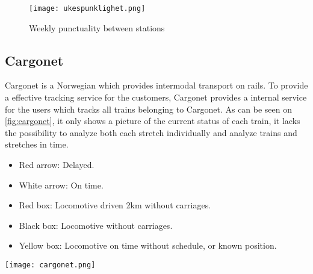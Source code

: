 \begin{figure}[!htbp]
	\texttt{[image: ukespunklighet.png]}
	\caption[Weekly punctuality between stations]{Weekly punctuality between stations \cite{sintefPresis}}
	\label{fig:ukespunklighet}
\end{figure}
\pagebreak

\subsection{Cargonet} %
\label{sub:subsection_cargonet}

Cargonet is a Norwegian which provides intermodal transport on rails. To 
provide a effective tracking service for the customers, Cargonet provides a 
internal service for the users which tracks all trains belonging to Cargonet.
As can be seen on \vref{fig:cargonet}, it only shows a picture of the current
status of each train, it lacks the possibility to analyze both each stretch 
individually  and analyze trains and stretches in time.

\begin{itemize}
	\item Red arrow:\hspace{4ex} Delayed.
	\item White arrow:\hspace{4ex} On time.
	\item Red box:\hspace{4ex} Locomotive driven 2km without carriages.
	\item Black box:\hspace{4ex} Locomotive without carriages.
	\item Yellow box:\hspace{4ex} Locomotive on time without schedule, or known position.
\end{itemize}

\begin{minipage}[\linewidth]
	\texttt{[image: cargonet.png]}
	\caption[Cargonet]{Cargonet \cite{cargonet}}
	\label{fig:cargonet}
\end{minipage}
\pagebreak
